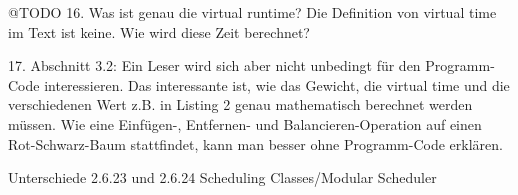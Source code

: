 @TODO
16. Was ist genau die virtual runtime? Die Definition von virtual time im Text ist keine. Wie wird diese Zeit berechnet?

17. Abschnitt 3.2: Ein Leser wird sich aber nicht unbedingt für den Programm-Code interessieren. Das interessante ist, wie das Gewicht, die virtual time und die verschiedenen Wert z.B. in Listing 2 genau mathematisch berechnet werden müssen. Wie eine Einfügen-, Entfernen- und Balancieren-Operation auf einen Rot-Schwarz-Baum stattfindet, kann man besser ohne Programm-Code erklären. 

Unterschiede 2.6.23 und 2.6.24 \cite{cpabla}
Scheduling Classes/Modular Scheduler
